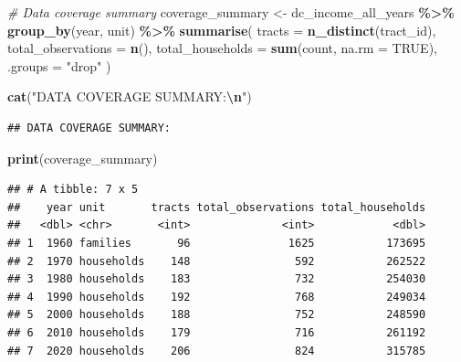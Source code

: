 \documentclass[
]{article}
\newenvironment{Shaded}{\begin{snugshade}}{\end{snugshade}}
\newcommand{\AttributeTok}[1]{\textcolor[rgb]{0.13,0.29,0.53}{#1}}
\newcommand{\CommentTok}[1]{\textcolor[rgb]{0.56,0.35,0.01}{\textit{#1}}}
\newcommand{\ConstantTok}[1]{\textcolor[rgb]{0.56,0.35,0.01}{#1}}
\newcommand{\FunctionTok}[1]{\textcolor[rgb]{0.13,0.29,0.53}{\textbf{#1}}}
\newcommand{\NormalTok}[1]{#1}
\newcommand{\OtherTok}[1]{\textcolor[rgb]{0.56,0.35,0.01}{#1}}
\newcommand{\SpecialCharTok}[1]{\textcolor[rgb]{0.81,0.36,0.00}{\textbf{#1}}}
\newcommand{\StringTok}[1]{\textcolor[rgb]{0.31,0.60,0.02}{#1}}
\begin{document}
\begin{Shaded}
\begin{Highlighting}[]
\CommentTok{\# Data coverage summary}
\NormalTok{coverage\_summary }\OtherTok{\textless{}{-}}\NormalTok{ dc\_income\_all\_years }\SpecialCharTok{\%\textgreater{}\%}
  \FunctionTok{group\_by}\NormalTok{(year, unit) }\SpecialCharTok{\%\textgreater{}\%}
  \FunctionTok{summarise}\NormalTok{(}
    \AttributeTok{tracts =} \FunctionTok{n\_distinct}\NormalTok{(tract\_id),}
    \AttributeTok{total\_observations =} \FunctionTok{n}\NormalTok{(),}
    \AttributeTok{total\_households =} \FunctionTok{sum}\NormalTok{(count, }\AttributeTok{na.rm =} \ConstantTok{TRUE}\NormalTok{),}
    \AttributeTok{.groups =} \StringTok{"drop"}
\NormalTok{  )}

\FunctionTok{cat}\NormalTok{(}\StringTok{"DATA COVERAGE SUMMARY:}\SpecialCharTok{\textbackslash{}n}\StringTok{"}\NormalTok{)}
\end{Highlighting}
\end{Shaded}

\begin{verbatim}
## DATA COVERAGE SUMMARY:
\end{verbatim}

\begin{Shaded}
\begin{Highlighting}[]
\FunctionTok{print}\NormalTok{(coverage\_summary)}
\end{Highlighting}
\end{Shaded}

\begin{verbatim}
## # A tibble: 7 x 5
##    year unit       tracts total_observations total_households
##   <dbl> <chr>       <int>              <int>            <dbl>
## 1  1960 families       96               1625           173695
## 2  1970 households    148                592           262522
## 3  1980 households    183                732           254030
## 4  1990 households    192                768           249034
## 5  2000 households    188                752           248590
## 6  2010 households    179                716           261192
## 7  2020 households    206                824           315785
\end{verbatim}
\end{document}
